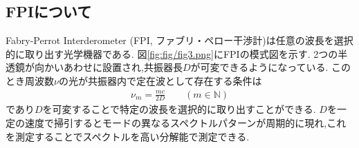 \subsection{FPIについて\cite{jikken}}
Fabry-Perrot Interderometer (FPI, ファブリ・ペロー干渉計)は任意の波長を選択的に取り出す光学機器である.
図\ref{fig:fig/fig3.png}にFPIの模式図を示す.
2つの半透鏡が向かいあわせに設置され,共振器長$D$が可変できるようになっている.
このとき周波数$\nu$の光が共振器内で定在波として存在する条件は
\begin{align}
  \nu_m=\frac{mc}{2D}\qquad(m\in\mathbb{N})
\end{align}
であり$D$を可変することで特定の波長を選択的に取り出すことができる.
$D$を一定の速度で掃引するとモードの異なるスペクトルパターンが周期的に現れ,これを測定することでスペクトルを高い分解能で測定できる.

